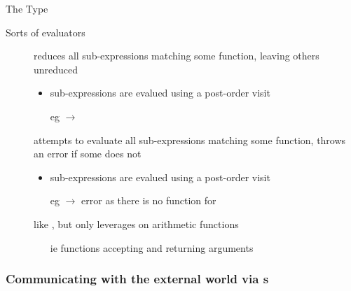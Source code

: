 \documentclass[handout]{beamer}
\begin{document}
\begin{frame}[allowframebreaks]{The  Type}
    \begin{block}{Sorts of evaluators}
        \begin{description}
            \item[] reduces all sub-expressions matching some function, leaving others unreduced
            \begin{itemize}\small
                \item sub-expressions are evalued using a \alert{post-order} visit
                \item[eg]  $\rightarrow$ 
            \end{itemize}
            \item[] attempts to evaluate all sub-expressions matching some function, throws an error if some does not
            \begin{itemize}\small
                \item sub-expressions are evalued using a \alert{post-order} visit
                \item[eg]  $\rightarrow$ error as there is no function for 
            \end{itemize}
            \item[] like , but only leverages on arithmetic functions
            \begin{itemize}\small
                \item[ie] functions accepting and returning  arguments
            \end{itemize}
        \end{description}
    \end{block}

    \framebreak

\end{frame}

\subsubsection{Communicating with the external world via s}
\end{document}
